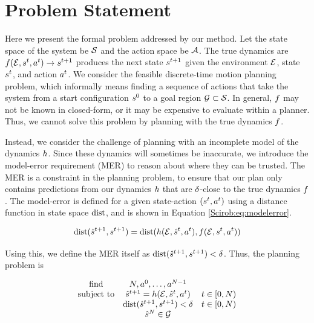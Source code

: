 \section{Problem Statement} \label{SciRob:sec:problem}

Here we present the formal problem addressed by our method. Let the state space of the system be $\mathcal S$ and the action space be $\mathcal{A}$. The true dynamics are $f(\mathcal{E},s^{t},a^{t})\rightarrow s^{t+1}$ produces the next state $s^{t+1}$ given the environment $\mathcal{E}$, state $s^{t}$, and action $a^{t}$. We consider the feasible discrete-time motion planning problem, which informally means finding a sequence of actions that take the system from a start configuration $s^0$ to a goal region $\mathcal{G} \subset \mathcal S$. In general, $f$ may not be known in closed-form, or it may be expensive to evaluate within a planner. Thus, we cannot solve this problem by planning with the true dynamics $f$.

Instead, we consider the challenge of planning with an incomplete model of the dynamics $h$. Since these dynamics will sometimes be inaccurate, we introduce the model-error requirement (MER) to reason about where they can be trusted. The MER is a constraint in the planning problem, to ensure that our plan only contains predictions from our dynamics $h$ that are $\delta$-close to the true dynamics $f$. The model-error is defined for a given state-action $(s^{t},a^{t})$ using a distance function in state space $\mathrm{dist}$, and is shown in Equation \eqref{Scirob:eq:modelerror}.

\begin{equation}
\mathrm{dist}(\hat{s}^{t+1},s^{t+1}) = \mathrm{dist}(h(\mathcal{E},\hat{s}^{t},a^{t}),f(\mathcal{E},s^{t},a^{t}))
\label{Scirob:eq:modelerror}
\end{equation}

Using this, we define the MER itself as $\mathrm{dist}(\hat{s}^{t+1},s^{t+1}) < \delta$. Thus, the planning problem is

\begin{equation}
  \begin{array}{ccll}
    \operatorname*{find} & N,a^0,\dots,a^{N-1} & \\
    \text{subject to} & \hat{s}^{t+1} = h(\mathcal{E},\hat{s}^{t},a^{t}) & t \in [0,N) \\
    & \mathrm{dist}(\hat{s}^{t+1},s^{t+1}) < \delta & t \in [0,N) \\
    & \hat{s}^{N} \in \mathcal{G} & \\
  \end{array}
  \label{Scirob:eq:planning_problem}
\end{equation}


